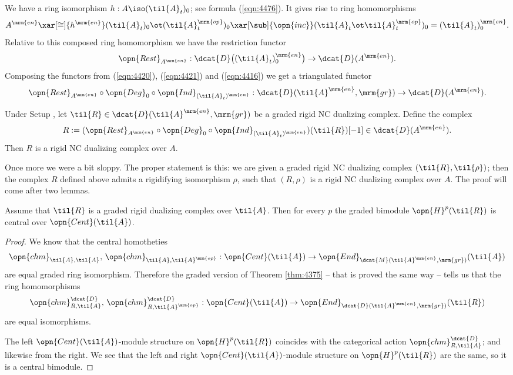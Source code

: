 We have a ring isomorphism 
$h : A \iso (\til{A}_t)_0$; see formula (\ref{eqn:4476}). It gives rise to 
ring homomorphisms 
\[ A^{\mrm{en}} \xar[\cong]{h^{\mrm{en}}}
(\til{A}_t)_0 \ot (\til{A}_t^{\mrm{op}})_0 
\xar[\sub]{\opn{inc}} 
(\til{A}_t \ot \til{A}_t^{\mrm{op}})_0 = (\til{A}_t)^{\mrm{en}}_0 . \]
Relative to this composed ring homomorphism we have the restriction functor 
\begin{equation} \label{eqn:4416}
\opn{Rest}_{A^{\mrm{en}}} : 
\dcat{D} \bigl( (\til{A}_t)^{\mrm{en}}_0 \bigr) \to 
\dcat{D}(A^{\mrm{en}}) . 
\end{equation}
Composing the functors from (\ref{eqn:4420}), (\ref{eqn:4421}) and 
(\ref{eqn:4416}) we get a triangulated functor 
\begin{equation} \label{eqn:4422}
\opn{Rest}_{A^{\mrm{en}}} \circ \opn{Deg}_0 \circ 
\opn{Ind}_{(\til{A}_t)^{\mrm{en}}} :
\dcat{D}(\til{A}^{\mrm{en}}, \mrm{gr}) \to \dcat{D}(A^{\mrm{en}}) . 
\end{equation}

\begin{thm} \label{thm:4395}
Under Setup \tup{\ref{set:4510}}, let 
$\til{R} \in \dcat{D}(\til{A}^{\mrm{en}}, \mrm{gr})$ be a 
graded rigid NC dualizing complex. Define the complex 
\[ R := (\opn{Rest}_{A^{\mrm{en}}} \circ \opn{Deg}_0 \circ 
\opn{Ind}_{(\til{A}_t)^{\mrm{en}}}) (\til{R})[-1] \in \dcat{D}(A^{\mrm{en}}) . 
\]
Then $R$ is a rigid NC dualizing complex over $A$.
\end{thm}

Once more we were a bit sloppy. The proper statement is this: 
we are given a graded rigid NC dualizing complex $(\til{R}, \til{\rho})$; 
then the complex $R$ defined above admits a rigidifying isomorphism $\rho$, 
such that $(R, \rho)$ is a rigid NC dualizing complex over $A$. The proof will 
come after two lemmas.  

\begin{lem} \label{lem:4393}
Assume that $\til{R}$ is a graded rigid dualizing complex over $\til{A}$.
Then for every $p$ the graded bimodule $\opn{H}^p(\til{R})$ is 
central over $\opn{Cent}(\til{A})$. 
\end{lem}

\begin{proof}
We know that the central homotheties 
\[ \opn{chm}^{}_{\til{A}, \til{A}} ,  \, 
\opn{chm}^{}_{\til{A}, \til{A}^{\mrm{op}}} :
\opn{Cent}(\til{A}) \to 
\opn{End}_{\dcat{M}(\til{A}^{\mrm{en}}, \mrm{gr})}(\til{A}) \]
are equal graded ring isomorphism.
Therefore the graded version of Theorem \ref{thm:4375} -- that is proved the 
same way -- tells us that the ring homomorphisms
\[ \opn{chm}^{\dcat{D}}_{R, \til{A}} , \,
\opn{chm}^{\dcat{D}}_{R, \til{A}^{\mrm{op}}} :
\opn{Cent}(\til{A}) 
\to \opn{End}_{\dcat{D}(\til{A}^{\mrm{en}}, \mrm{gr})}(\til{R})  \]
are equal isomorphisms.
  
The left $\opn{Cent}(\til{A})$-module structure on $\opn{H}^p(\til{R})$
coincides with the categorical action $\opn{chm}^{\dcat{D}}_{R, \til{A}}$; 
and likewise from the right. We see that the left and right 
$\opn{Cent}(\til{A})$-module structure on $\opn{H}^p(\til{R})$
are the same, so it is a central bimodule. 
\end{proof}

